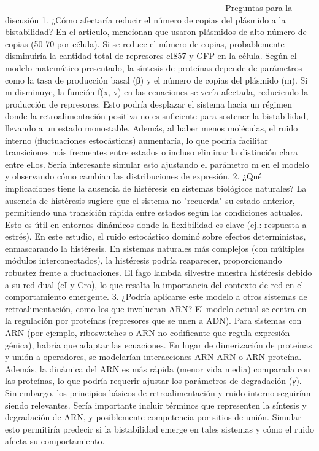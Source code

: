 ----------------------------------------------------------------------------
Preguntas para la discusión 
1.	¿Cómo afectaría reducir el número de copias del plásmido a la bistabilidad?
En el artículo, mencionan que usaron plásmidos de alto número de copias (50-70 por célula). Si se reduce el número de copias, probablemente disminuiría la cantidad total de represores cI857 y GFP en la célula. Según el modelo matemático presentado, la síntesis de proteínas depende de parámetros como la tasa de producción basal (β) y el número de copias del plásmido (m). Si m disminuye, la función f(x, v) en las ecuaciones se vería afectada, reduciendo la producción de represores. Esto podría desplazar el sistema hacia un régimen donde la retroalimentación positiva no es suficiente para sostener la bistabilidad, llevando a un estado monostable. Además, al haber menos moléculas, el ruido interno (fluctuaciones estocásticas) aumentaría, lo que podría facilitar transiciones más frecuentes entre estados o incluso eliminar la distinción clara entre ellos. Sería interesante simular esto ajustando el parámetro m en el modelo y observando cómo cambian las distribuciones de expresión.
2.	¿Qué implicaciones tiene la ausencia de histéresis en sistemas biológicos naturales?
La ausencia de histéresis sugiere que el sistema no "recuerda" su estado anterior, permitiendo una transición rápida entre estados según las condiciones actuales. Esto es útil en entornos dinámicos donde la flexibilidad es clave (ej.: respuesta a estrés).
En este estudio, el ruido estocástico dominó sobre efectos deterministas, enmascarando la histéresis. En sistemas naturales más complejos (con múltiples módulos interconectados), la histéresis podría reaparecer, proporcionando robustez frente a fluctuaciones.
El fago lambda silvestre muestra histéresis debido a su red dual (cI y Cro), lo que resalta la importancia del contexto de red en el comportamiento emergente.
3.	¿Podría aplicarse este modelo a otros sistemas de retroalimentación, como los que involucran ARN?
El modelo actual se centra en la regulación por proteínas (represores que se unen a ADN). Para sistemas con ARN (por ejemplo, riboswitches o ARN no codificante que regula expresión génica), habría que adaptar las ecuaciones. En lugar de dimerización de proteínas y unión a operadores, se modelarían interacciones ARN-ARN o ARN-proteína. Además, la dinámica del ARN es más rápida (menor vida media) comparada con las proteínas, lo que podría requerir ajustar los parámetros de degradación (γ). Sin embargo, los principios básicos de retroalimentación y ruido interno seguirían siendo relevantes. Sería importante incluir términos que representen la síntesis y degradación de ARN, y posiblemente competencia por sitios de unión. Simular esto permitiría predecir si la bistabilidad emerge en tales sistemas y cómo el ruido afecta su comportamiento.
